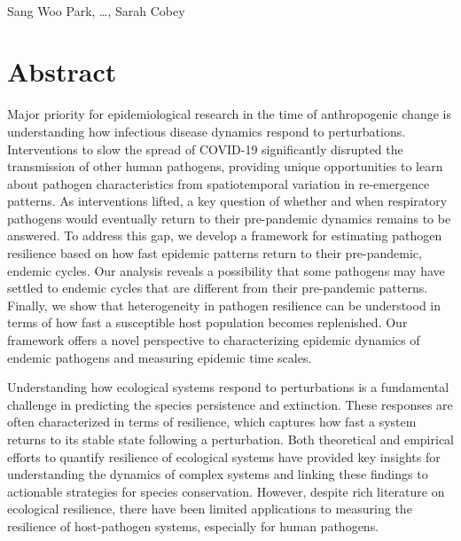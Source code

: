 \documentclass[12pt]{article}
\date{\today}
\begin{document}
\begin{flushleft}{
	\Large
	\textbf{}
}
\newline
\\
Sang Woo Park, \dots, Sarah Cobey
\\
\bigskip
\end{flushleft}

\section*{Abstract}

Major priority for epidemiological research in the time of anthropogenic change is understanding how infectious disease dynamics respond to perturbations.
Interventions to slow the spread of COVID-19 significantly disrupted the transmission of other human pathogens, providing unique opportunities to learn about pathogen characteristics from spatiotemporal variation in re-emergence patterns. 
As interventions lifted, a key question of whether and when respiratory pathogens would eventually return to their pre-pandemic dynamics remains to be answered. 
To address this gap, we develop a framework for estimating pathogen resilience based on how fast epidemic patterns return to their pre-pandemic, endemic cycles.
Our analysis reveals a possibility that some pathogens may have settled to endemic cycles that are different from their pre-pandemic patterns.
Finally, we show that heterogeneity in pathogen resilience can be understood in terms of how fast a susceptible host population becomes replenished.
Our framework offers a novel perspective to characterizing epidemic dynamics of endemic pathogens and measuring epidemic time scales.

\pagebreak

Understanding how ecological systems respond to perturbations is a fundamental challenge in predicting the species persistence and extinction.
These responses are often characterized in terms of resilience, which captures how fast a system returns to its stable state following a perturbation.
Both theoretical and empirical efforts to quantify resilience of ecological systems have provided key insights for understanding the dynamics of complex systems and linking these findings to actionable strategies for species conservation.
However, despite rich literature on ecological resilience, there have been limited applications to measuring the resilience of host-pathogen systems, especially for human pathogens.
\end{document}
